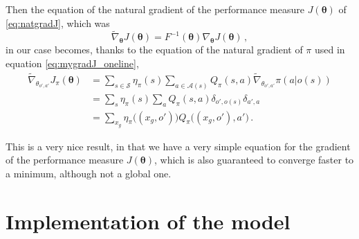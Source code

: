 Then the equation of the natural gradient of the performance measure $J(\boldsymbol \theta)$ of \eqref{eq:natgradJ}, which was
\begin{equation*}
    \widetilde \nabla_{\boldsymbol \theta} J(\boldsymbol \theta) = F^{-1}(\boldsymbol \theta) \nabla_{\boldsymbol \theta} J(\boldsymbol \theta) \, ,
\end{equation*}
in our case becomes, thanks to the equation of the natural gradient of $\pi$ used in equation \eqref{eq:mygradJ_oneline},
\begin{equation}
    \begin{aligned}
        \widetilde \nabla_{\theta_{o',a'}} J_\pi (\boldsymbol \theta)
        &= \sum_{s \in \mathcal S} \eta_\pi(s) \sum_{a \in \mathcal A(s)} Q_\pi(s,a) \widetilde \nabla_{\theta_{o',a'}} \pi(a|o(s)) \\
        &= \sum_s \eta_\pi(s) \sum_a Q_\pi(s,a) \delta_{o', o(s)} \delta_{a',a} \\
        &= \sum_{x_g} \eta_\pi \big((x_g, o') \big) Q_\pi \big((x_g, o'), a' \big)\, .
    \end{aligned}
    \label{eq:mynatgradJ}
\end{equation}

This is a very nice result, in that we have a very simple equation for the gradient of the performance measure $J(\boldsymbol \theta)$, which is also guaranteed to converge faster to a minimum, although not a global one.


\section{Implementation of the model}

